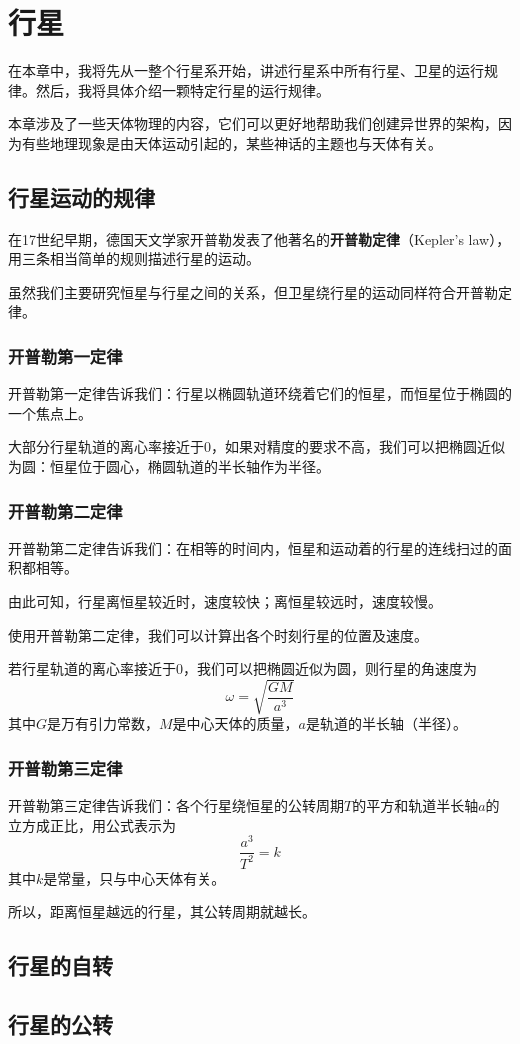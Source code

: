 \chapter{行星}
在本章中，我将先从一整个行星系开始，讲述行星系中所有行星、卫星的运行规律。然后，我将具体介绍一颗特定行星的运行规律。

本章涉及了一些天体物理的内容，它们可以更好地帮助我们创建异世界的架构，因为有些地理现象是由天体运动引起的，某些神话的主题也与天体有关。

\section{行星运动的规律}
在17世纪早期，德国天文学家开普勒发表了他著名的\textbf{开普勒定律}（Kepler's law），用三条相当简单的规则描述行星的运动。

虽然我们主要研究恒星与行星之间的关系，但卫星绕行星的运动同样符合开普勒定律。

\subsection{开普勒第一定律}
开普勒第一定律告诉我们：行星以椭圆轨道环绕着它们的恒星，而恒星位于椭圆的一个焦点上。

大部分行星轨道的离心率接近于0，如果对精度的要求不高，我们可以把椭圆近似为圆：恒星位于圆心，椭圆轨道的半长轴作为半径。

\subsection{开普勒第二定律}
开普勒第二定律告诉我们：在相等的时间内，恒星和运动着的行星的连线扫过的面积都相等。

由此可知，行星离恒星较近时，速度较快；离恒星较远时，速度较慢。

使用开普勒第二定律，我们可以计算出各个时刻行星的位置及速度。

若行星轨道的离心率接近于0，我们可以把椭圆近似为圆，则行星的角速度为\[\omega=\sqrt{\frac{GM}{a^3}}\]其中$G$是万有引力常数，$M$是中心天体的质量，$a$是轨道的半长轴（半径）。

\subsection{开普勒第三定律}
开普勒第三定律告诉我们：各个行星绕恒星的公转周期$T$的平方和轨道半长轴$a$的立方成正比，用公式表示为\[\frac{a^3}{T^2}=k\]其中$k$是常量，只与中心天体有关。

所以，距离恒星越远的行星，其公转周期就越长。

\section{行星的自转}

\section{行星的公转}
